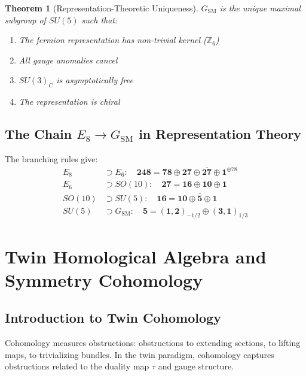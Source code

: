 \documentclass[11pt,a4paper,openright]{book}
\theoremstyle{plain}
\newtheorem{theorem}{Theorem}[chapter]
\theoremstyle{definition}
\newcommand{\SM}{\mathrm{SM}}
\newcommand{\Z}{\mathbb{Z}}
\begin{document}
\begin{theorem}[Representation-Theoretic Uniqueness]
$G_{\SM}$ is the unique maximal subgroup of $SU(5)$ such that:
\begin{enumerate}
    \item The fermion representation has non-trivial kernel ($\Z_6$)
    \item All gauge anomalies cancel
    \item $SU(3)_C$ is asymptotically free
    \item The representation is chiral
\end{enumerate}
\end{theorem}

\section{The Chain $E_8 \to G_{\SM}$ in Representation Theory}

The branching rules give:
\begin{align}
E_8 &\supset E_6: \quad \mathbf{248} = \mathbf{78} \oplus \mathbf{27} \oplus \overline{\mathbf{27}} \oplus \mathbf{1}^{\oplus 78} \\
E_6 &\supset SO(10): \quad \mathbf{27} = \mathbf{16} \oplus \mathbf{10} \oplus \mathbf{1} \\
SO(10) &\supset SU(5): \quad \mathbf{16} = \mathbf{10} \oplus \bar{\mathbf{5}} \oplus \mathbf{1} \\
SU(5) &\supset G_{\SM}: \quad \mathbf{5} = (\mathbf{1},\mathbf{2})_{-1/2} \oplus (\mathbf{3},\mathbf{1})_{1/3}
\end{align}

\chapter{Twin Homological Algebra and Symmetry Cohomology}
\label{ch:cohomology}

\section{Introduction to Twin Cohomology}

Cohomology measures obstructions: obstructions to extending sections, to lifting maps, to trivializing bundles. In the twin paradigm, cohomology captures obstructions related to the duality map $\tau$ and gauge structure.
\end{document}

